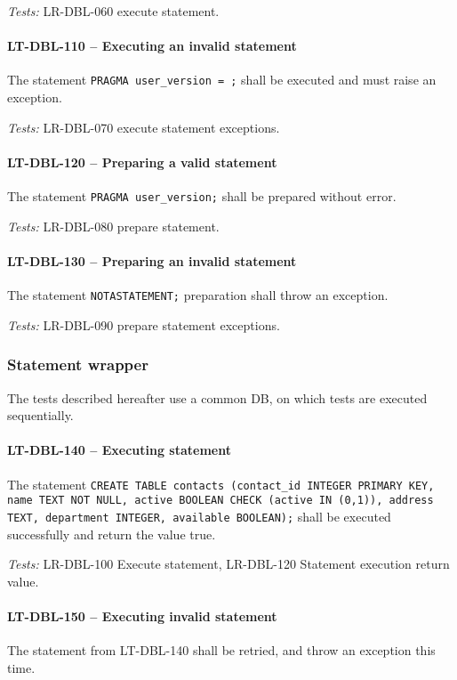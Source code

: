 \textit{Tests: } LR-DBL-060 execute statement.

\paragraph{LT-DBL-110 -- Executing an invalid statement}
The statement \lstinline{PRAGMA user_version = ;} shall be executed and must
raise an exception.

\textit{Tests: } LR-DBL-070 execute statement exceptions.

\paragraph{LT-DBL-120 -- Preparing a valid statement}
The statement \lstinline{PRAGMA user_version;} shall be prepared
without error.

\textit{Tests: } LR-DBL-080 prepare statement.

\paragraph{LT-DBL-130 -- Preparing an invalid statement}
The statement \lstinline{NOTASTATEMENT;} preparation shall
throw an exception.

\textit{Tests: } LR-DBL-090 prepare statement exceptions.

\subsubsection{Statement wrapper}
The tests described hereafter use a common DB, on which tests are
executed sequentially.

\paragraph{LT-DBL-140 -- Executing statement}
The statement
\lstinline{CREATE TABLE contacts (contact_id INTEGER PRIMARY KEY, name TEXT NOT NULL, active BOOLEAN CHECK (active IN (0,1)), address TEXT, department INTEGER, available BOOLEAN);}
shall be executed successfully and return the value true.

\textit{Tests: } LR-DBL-100 Execute statement,
LR-DBL-120 Statement execution return value.

\paragraph{LT-DBL-150 -- Executing invalid statement}
The statement from LT-DBL-140 shall be retried, and throw an exception
this time.

